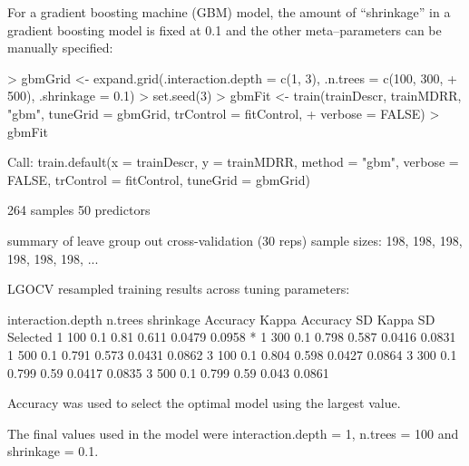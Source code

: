 \documentclass[12pt]{article}
\begin{document}
For a gradient boosting machine (GBM) model, the amount of ``shrinkage'' in a gradient boosting model is fixed at 0.1 and the other meta--parameters can be manually specified:
\pagestyle{plain}
\begin{small}
\begin{landscape}

\begin{Schunk}
\begin{Sinput}
> gbmGrid <- expand.grid(.interaction.depth = c(1, 3), .n.trees = c(100, 300, 
+     500), .shrinkage = 0.1)
> set.seed(3)
> gbmFit <- train(trainDescr, trainMDRR, "gbm", tuneGrid = gbmGrid, trControl = fitControl, 
+     verbose = FALSE)
> gbmFit
\end{Sinput}
\begin{Soutput}
Call:
train.default(x = trainDescr, y = trainMDRR, method = "gbm", 
    verbose = FALSE, trControl = fitControl, tuneGrid = gbmGrid)

264 samples
50 predictors

summary of leave group out cross-validation (30 reps) sample sizes:
    198, 198, 198, 198, 198, 198, ... 

LGOCV resampled training results across tuning parameters:

  interaction.depth  n.trees  shrinkage  Accuracy  Kappa  Accuracy SD  Kappa SD  Selected
  1                  100      0.1        0.81      0.611  0.0479       0.0958    *       
  1                  300      0.1        0.798     0.587  0.0416       0.0831            
  1                  500      0.1        0.791     0.573  0.0431       0.0862            
  3                  100      0.1        0.804     0.598  0.0427       0.0864            
  3                  300      0.1        0.799     0.59   0.0417       0.0835            
  3                  500      0.1        0.799     0.59   0.043        0.0861            

Accuracy was used to select the optimal model using the largest value.

The final values used in the model were interaction.depth = 1, n.trees = 100 and shrinkage = 0.1.
\end{Soutput}
\end{Schunk}

\end{landscape}
\end{small}
\pagestyle{fancy}
\end{document}
